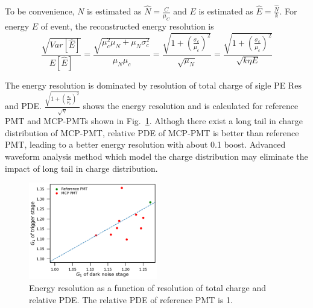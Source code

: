 To be convenience, $N$ is estimated as $\hat{N}=\frac{C}{\mu_C}$ and $E$ is estimated as $\hat{E}=\frac{\hat{N}}{k}$. For  energy $E$ of event, the reconstructed energy resolution is 
\begin{equation}
    \frac{\sqrt{Var[\hat{E}]}}{E[\hat{E}]}=\frac{\sqrt{\mu_c^2\mu_N+\mu_N\sigma_c^2}}{\mu_N\mu_c}=\frac{\sqrt{1+(\frac{\sigma_c}{\mu_c})^2}}{\sqrt{\mu_N}}=\frac{\sqrt{1+(\frac{\sigma_c}{\mu_c})^2}}{\sqrt{k\eta E}}
\end{equation}

The energy resolution is dominated by resolution of total charge of sigle PE $\mathrm{Res}$ and PDE. $\frac{\sqrt{1+(\frac{\sigma_c}{\mu_c})^2}}{\sqrt{\eta}}$ shows the energy resolution and is calculated for reference PMT and MCP-PMTs shown in Fig.~\ref{fig:EnergyResolution}. Althogh there exist a long tail in charge distribution of MCP-PMT, relative PDE of MCP-PMT is better than reference PMT, leading to a better energy resolution with about 0.1 boost. Advanced waveform analysis method which model the charge distribution may eliminate the impact of long tail in charge distribution.
\begin{figure}[!htbp]
    \centering
    \includegraphics[width=0.5\textwidth,page=14]{figures/result/compare.pdf}
    \caption{Energy resolution as a function of resolution of total charge and relative PDE. The relative PDE of reference PMT is 1.}
    \label{fig:EnergyResolution}
\end{figure}